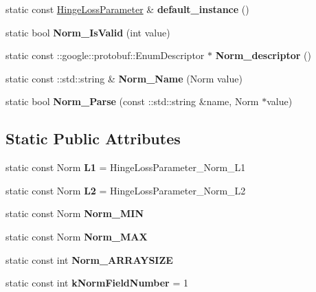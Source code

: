 \begin{DoxyCompactItemize}
static const \mbox{\hyperlink{classcaffe_1_1_hinge_loss_parameter}{Hinge\+Loss\+Parameter}} \& {\bfseries default\+\_\+instance} ()
\item 
\mbox{\label{classcaffe_1_1_hinge_loss_parameter_a4c08201dbc4ea88cec0e7c153f7f3163}} 
static bool {\bfseries Norm\+\_\+\+Is\+Valid} (int value)
\item 
\mbox{\label{classcaffe_1_1_hinge_loss_parameter_a6aa538200e2bb376f3fea4b72399fae2}} 
static const \+::google\+::protobuf\+::\+Enum\+Descriptor $\ast$ {\bfseries Norm\+\_\+descriptor} ()
\item 
\mbox{\label{classcaffe_1_1_hinge_loss_parameter_ad5aec808196586b93f860d2082d12e20}} 
static const \+::std\+::string \& {\bfseries Norm\+\_\+\+Name} (Norm value)
\item 
\mbox{\label{classcaffe_1_1_hinge_loss_parameter_aa17bbda463cf74c1f826d60e56d04095}} 
static bool {\bfseries Norm\+\_\+\+Parse} (const \+::std\+::string \&name, Norm $\ast$value)
\end{DoxyCompactItemize}
\subsection*{Static Public Attributes}
\begin{DoxyCompactItemize}
\item 
\mbox{\label{classcaffe_1_1_hinge_loss_parameter_ad821351efe56f6872f8f6dbb4b6879a3}} 
static const Norm {\bfseries L1} = Hinge\+Loss\+Parameter\+\_\+\+Norm\+\_\+\+L1
\item 
\mbox{\label{classcaffe_1_1_hinge_loss_parameter_adf2a294d3d6ed502d22649fcb186d4b7}} 
static const Norm {\bfseries L2} = Hinge\+Loss\+Parameter\+\_\+\+Norm\+\_\+\+L2
\item 
static const Norm {\bfseries Norm\+\_\+\+M\+IN}
\item 
static const Norm {\bfseries Norm\+\_\+\+M\+AX}
\item 
static const int {\bfseries Norm\+\_\+\+A\+R\+R\+A\+Y\+S\+I\+ZE}
\item 
\mbox{\label{classcaffe_1_1_hinge_loss_parameter_acf864e762c92e39b0f3a2aaad9009cc5}} 
static const int {\bfseries k\+Norm\+Field\+Number} = 1
\end{DoxyCompactItemize}
